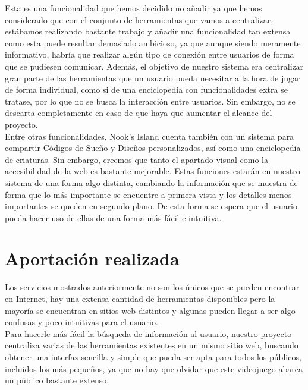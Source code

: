 Esta es una funcionalidad que hemos decidido no añadir ya que hemos considerado que con el conjunto de herramientas que vamos a centralizar, estábamos realizando bastante trabajo y añadir una funcionalidad tan extensa como esta puede resultar demasiado ambicioso, ya que aunque siendo meramente informativo, habría que realizar algún tipo de conexión entre usuarios de forma que se pudiesen comunicar. Además, el objetivo de nuestro sistema era centralizar gran parte de las herramientas que un usuario pueda necesitar a la hora de jugar de forma individual, como si de una enciclopedia con funcionalidades extra se tratase, por lo que no se busca la interacción entre usuarios. Sin embargo, no se descarta completamente en caso de que haya que aumentar el alcance del proyecto.\\

Entre otras funcionalidades, Nook's Island cuenta también con un sistema para compartir Códigos de Sueño y Diseños personalizados, así como una enciclopedia de criaturas. Sin embargo, creemos que tanto el apartado visual como la accesibilidad de la web es bastante mejorable. Estas funciones estarán en nuestro sistema de una forma algo distinta, cambiando la información que se muestra de forma que lo más importante se encuentre a primera vista y los detalles menos importantes se queden en segundo plano. De esta forma se espera que el usuario pueda hacer uso de ellas de una forma más fácil e intuitiva.

\clearpage

\section{Aportación realizada}

Los servicios mostrados anteriormente no son los únicos que se pueden encontrar en Internet, hay una extensa cantidad de herramientas disponibles \citep{acnhdirectory} pero la mayoría se encuentran en sitios web distintos y algunas pueden llegar a ser algo confusas y poco intuitivas para el usuario.\\

Para hacerle más fácil la búsqueda de información al usuario, nuestro proyecto centraliza varias de las herramientas existentes en un mismo sitio web, buscando obtener una interfaz sencilla y simple que pueda ser apta para todos los públicos, incluidos los más pequeños, ya que no hay que olvidar que este videojuego abarca un público bastante extenso.\\


